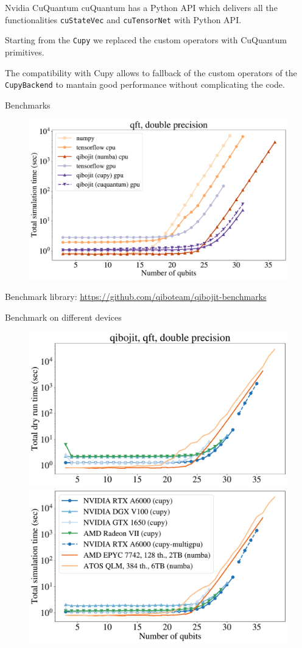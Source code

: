 \documentclass[11p,aspectratio=169]{beamer}
\begin{document}
\begin{frame}{Nvidia CuQuantum}
    cuQuantum has a Python API which delivers all the functionalities 
    \texttt{cuStateVec} and \texttt{cuTensorNet} with Python API.

    Starting from the \texttt{Cupy} we replaced the custom operators with CuQuantum
    primitives.

    The compatibility with Cupy allows to fallback of the custom operators
    of the \texttt{CupyBackend} to mantain good performance without complicating the code.

\end{frame} 
\begin{frame}{Benchmarks}
    \begin{figure}
        \includegraphics[width=0.8 \textwidth]{figures/qibo_scaling_qft_total_simulation_time_double.pdf} 
    \end{figure}
    Benchmark library: \url{https://github.com/qiboteam/qibojit-benchmarks}
\end{frame}

\begin{frame}{Benchmark on different devices}

            \begin{figure}
                \includegraphics[width = 0.5 \textwidth]{figures/devices_qft_total_dry_time_double.pdf}
                \includegraphics[width = 0.5 \textwidth]{figures/devices_qft_total_simulation_time_double.pdf}
            \end{figure}
    
\end{frame}
\end{document}

